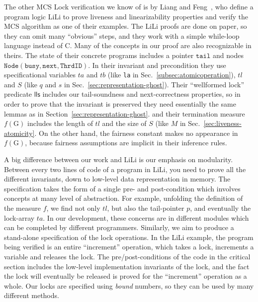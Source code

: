 The other MCS Lock verification we know of is by Liang and
Feng~\cite{liang:lili}, who define a program logic LiLi to prove
liveness and linearizability properties and verify the MCS algorithm
as one of their examples.  The LiLi proofs are done on paper, so they
can omit many ``obvious'' steps, and they work with a simple
while-loop language instead of C. Many of the concepts in our proof
are also recognizable in theirs. The state of their concrete
  programs includes a pointer $\mathrm{\texttt{tail}}$ and nodes
  $\mathrm{\texttt{Node}}(\mathrm{\texttt{busy}}, \mathrm{\texttt{next}}, \mathrm{\texttt{ThrdID}})$.
In their invariant and precondition they use specificational variables
$\mathrm{\textit{ta}}$ and $\mathrm{\textit{tb}}$ (like \texttt{la} in
Sec.~\ref{subsec:atomicoperation}), $\mathrm{\textit{tl}}$ and $S$ (like $q$
and $s$ in Sec.~\ref{sec:representation-ghost}). Their
  ``wellformed lock'' predicate $\mathrm{\textsf{lls}}$ includes our
  tail-soundness and next-correctness properties, so in order to prove
  that the invariant is preserved they need essentially the same
  lemmas as in Section~\ref{sec:representation-ghost}. and their
termination measure $f(\mathrm{G})$ includes the length of
$\mathit{tl}$ and the size of $S$ (like $M$ in
Sec.~\ref{sec:liveness-atomicity}. On the other hand, the fairness
constant makes no appearance in $f(\mathrm{G})$, because fairness
assumptions are implicit in their inference rules.

A big difference between our work and LiLi is our emphasis on
modularity.  Between every two lines of code of a program in LiLi, you
need to prove all the different invariants, down to low-level data
representation in memory. The specification takes the form of a single
pre- and post-condition which involves concepts at many level of
abstraction. For example, unfolding the definition of the measure $f$,
we find not only $\mathit{tl}$, but also the tail-pointer $p$, and
eventually the lock-array $\mathit{ta}$. In our development, these
concerns are in different modules which can be completed by different
programmers.  Similarly, we aim to produce a stand-alone specification
of the lock operations. In the LiLi example, the program being
verified is an entire ``increment'' operation, which takes a lock,
increments a variable and releases the lock. The pre/post-conditions
of the code in the critical section includes the low-level
implementation invariants of the lock, and the fact the lock will
eventually be released is proved for the ``increment'' operation as a
whole. Our locks are specified using \emph{bound} numbers, so they can
be used by many different methods.

